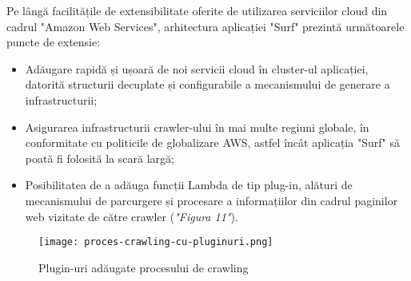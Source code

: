 Pe lângă facilitățile de extensibilitate oferite de utilizarea serviciilor cloud din cadrul "Amazon Web Services", arhitectura aplicației "Surf" prezintă următoarele puncte de extensie:

\begin{itemize}
	\item{Adăugare rapidă și ușoară de noi servicii cloud în cluster-ul aplicației, datorită structurii decuplate și configurabile a mecanismului de generare a infrastructurii;}
	\item{Asigurarea infrastructurii crawler-ului în mai multe regiuni globale, în conformitate cu politicile de globalizare AWS, astfel încât aplicația "Surf" să poată fi folosită la scară largă;}
	\item{Posibilitatea de a adăuga funcții Lambda de tip plug-in, alături de mecanismului de parcurgere și procesare a informațiilor din cadrul paginilor web vizitate de către crawler (\textit{"Figura 11"}).}
\end{itemize}

\begin{figure}[ht]
\begin{center}
	\texttt{[image: proces-crawling-cu-pluginuri.png]}
	\caption{Plugin-uri adăugate procesului de crawling \cite{diagram-icons-sources, aws-icons-source}}\par\medskip 

\end{center}
\end{figure}